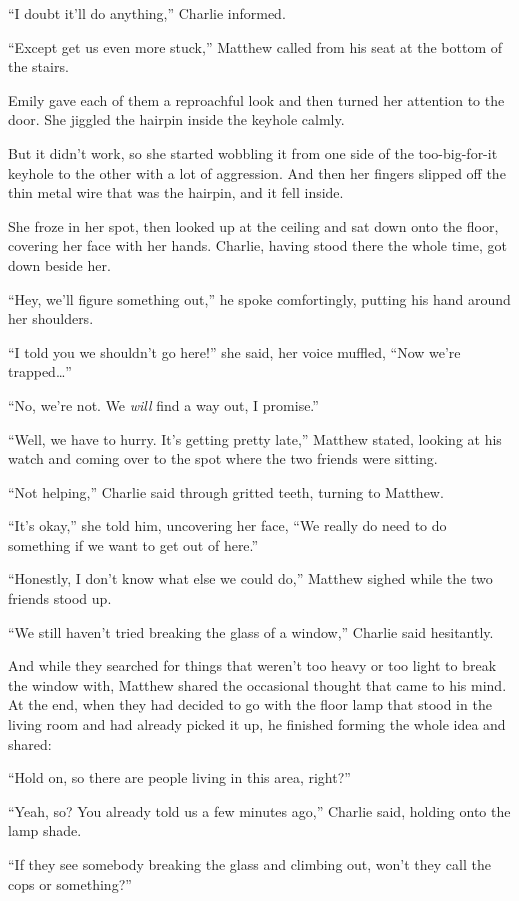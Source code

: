 “I doubt it'll do anything,” Charlie informed.

“Except get us even more stuck,” Matthew called from his seat at the bottom of the stairs.

Emily gave each of them a reproachful look and then turned her attention to the door. She jiggled the hairpin inside the keyhole calmly.

But it didn't work, so she started wobbling it from one side of the too-big-for-it keyhole to the other with a lot of aggression. And then her fingers slipped off the thin metal wire that was the hairpin, and it fell inside.

She froze in her spot, then looked up at the ceiling and sat down onto the floor, covering her face with her hands. Charlie, having stood there the whole time, got down beside her.

“Hey, we'll figure something out,” he spoke comfortingly, putting his hand around her shoulders.

“I told you we shouldn't go here!” she said, her voice muffled, “Now we're trapped…”

“No, we're not. We \textit{will} find a way out, I promise.”

“Well, we have to hurry. It's getting pretty late,” Matthew stated, looking at his watch and coming over to the spot where the two friends were sitting.

“Not helping,” Charlie said through gritted teeth, turning to Matthew.

“It's okay,” she told him, uncovering her face, “We really do need to do something if we want to get out of here.”

“Honestly, I don't know what else we could do,” Matthew sighed while the two friends stood up.

“We still haven't tried breaking the glass of a window,” Charlie said hesitantly.

And while they searched for things that weren't too heavy or too light to break the window with, Matthew shared the occasional thought that came to his mind. At the end, when they had decided to go with the floor lamp that stood in the living room and had already picked it up, he finished forming the whole idea and shared:

“Hold on, so there are people living in this area, right?”

“Yeah, so? You already told us a few minutes ago,” Charlie said, holding onto the lamp shade.

“If they see somebody breaking the glass and climbing out, won't they call the cops or something?”

